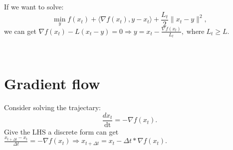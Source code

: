 \documentclass{article}
\newcommand{\tmop}[1]{\ensuremath{\operatorname{#1}}}
\begin{document}
\begin{CJK*}{UTF8}{gbsn}

If we want to solve:
\begin{equation}
  \underset{y}{\min} f (x_t) + \langle \nabla f (x_t), y - x_t \rangle +
  \frac{L_t}{2} \| x_t - y \|^2,
\end{equation}
we can get $\nabla f (x_t) - L (x_t - y) = 0 \Rightarrow y = x_t -
\frac{\nabla f (x_t)}{L_t}, \tmop{where} L_t \geqslant L.$

\

\section{Gradient flow}

Consider solving the trajectary:
\begin{equation}
  \frac{d x_t}{\tmop{dt}} = - \nabla f (x_t) .
\end{equation}
Give the LHS a discrete form can get $\frac{x_{t + \Delta t} - x_t}{\Delta t}
= - \nabla f (x_t) \Rightarrow x_{t + \Delta t} = x_t - \Delta t \ast \nabla f
(x_t) .$

\end{CJK*}
\end{document}
